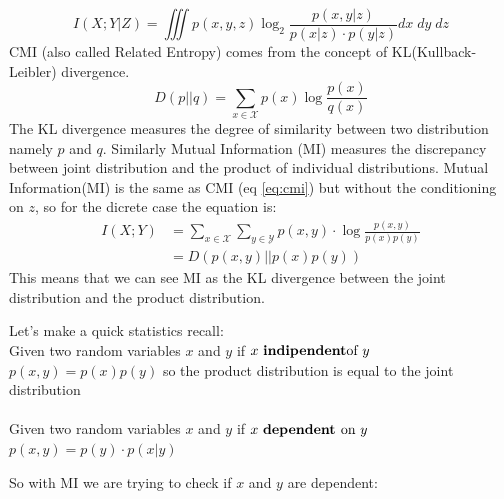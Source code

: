 \begin{equation}
    I(X;Y|Z)=\iiint{p(x,y,z)\log_2{\frac{p(x, y| z)}{p(x|z)\cdot p(y|z)}}dx\;dy\;dz}
    \label{eq:cmi}
\end{equation}
CMI (also called Related Entropy) comes from the concept of KL(Kullback-Leibler) divergence.
\begin{equation}
    D(p||q)=\sum_{x\in\mathcal{X}}p(x)\log{\frac{p(x)}{q(x)}}
\end{equation}
The KL divergence measures the degree of similarity between two distribution namely $p$ and $q$.
Similarly Mutual Information (MI) measures the discrepancy between joint distribution and the product of individual distributions.
Mutual Information(MI) is the same as CMI (eq \ref{eq:cmi}) but without the conditioning on $z$, so for the dicrete case the equation is:
\begin{equation}\label{eq:mi_disc}
    \begin{split}
        I(X;Y)&=\sum_{x\in\mathcal{X}}\sum_{y\in\mathcal{Y}}p(x,y)\cdot\log{\frac{p(x,y)}{p(x)p(y)}}\\
        &=D(p(x,y)||p(x)p(y))
    \end{split}
\end{equation}
This means that we can see MI as the KL divergence between the joint distribution and the product distribution.

\begin{tcolorbox}[colbacktitle=black!7!white,coltitle=black!75!white,title=\textbf{Statistics Recall}]
Let's make a quick statistics recall:\\
Given two random variables $x$ and $y$ if $x \text{ \textbf{indipendent}of } y$\\
$p(x,y) = p(x)p(y)$ so the product distribution is equal to the joint distribution\\\\
Given two random variables $x$ and $y$ if $x \text{ \textbf{dependent }on } y$\\
$p(x,y)=p(y)\cdot p(x|y)$
\end{tcolorbox}

So with MI we are trying to check if $x$ and $y$ are dependent:\\

